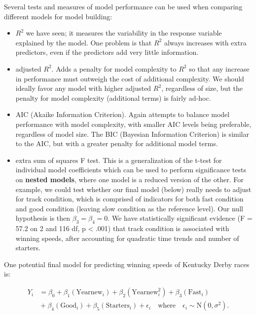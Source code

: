 \documentclass[
]{krantz}
\providecommand{\tightlist}{%
  \setlength{\itemsep}{0pt}\setlength{\parskip}{0pt}}
\begin{document}
Several tests and measures of model performance can be used when comparing different models for model building:

\begin{itemize}
\tightlist
\item
  \(R^2\) we have seen; it measures the variability in the response variable explained by the model. One problem is that \(R^2\) always increases with extra predictors, even if the predictors add very little information.
\item
  adjusted \(R^2\). Adds a penalty for model complexity to \(R^2\) so that any increase in performance must outweigh the cost of additional complexity. We should ideally favor any model with higher adjusted \(R^2\), regardless of size, but the penalty for model complexity (additional terms) is fairly ad-hoc.
\item
  AIC (Akaike Information Criterion). Again attempts to balance model performance with model complexity, with smaller AIC levels being preferable, regardless of model size. The BIC (Bayesian Information Criterion) is similar to the AIC, but with a greater penalty for additional model terms.
\item
  extra sum of squares F test. This is a generalization of the t-test for individual model coefficients which can be used to perform significance tests on \textbf{nested models}, where one model is a reduced version of the other. For example, we could test whether our final model (below) really needs to adjust for track condition, which is comprised of indicators for both fast condition and good condition (leaving slow condition as the reference level). Our null hypothesis is then \(\beta_{3}=\beta_{4}=0\). We have statistically significant evidence (F = 57.2 on 2 and 116 df, p \textless{} .001) that track condition is associated with winning speeds, after accounting for quadratic time trends and number of starters.
\end{itemize}

One potential final model for predicting winning speeds of Kentucky Derby races is:

\begin{equation}
\begin{split}
 Y_{i}&=\beta_{0}+\beta_{1}(\textrm{Yearnew}_{i})+\beta_{2}(\textrm{Yearnew}^2_{i})+\beta_{3}(\textrm{Fast}_{i})\\
      &{}+\beta_{4}(\textrm{Good}_{i})+\beta_{5}(\textrm{Starters}_{i})+\epsilon_{i}\quad 
      \textrm{where}\quad \epsilon_{i}\sim \textrm{N}(0,\sigma^2).
\end{split}
\label{eq:model0}
\end{equation}
\end{document}
